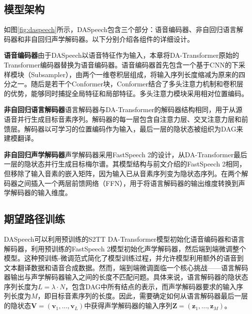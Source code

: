 \subsection{模型架构}\label{sec:daspeech_arch}

如图\ref{fig:daspeech}所示，DASpeech包含三个部分：语音编码器、非自回归语言解码器和非自回归声学解码器。以下分别介绍各组件的详细设计。

\textbf{语音编码器}\quad 由于DASpeech以语音特征作为输入，本章将DA-Transformer原始的Transformer编码器替换为语音编码器。语音编码器首先包含一个基于CNN的下采样模块（Subsampler），由两个一维卷积层组成，将输入序列长度缩减为原来的四分之一。随后是若干个Conformer\citep{conformer}块，Conformer结合了多头注意力机制和卷积层的优势，能够同时捕捉全局特征和局部特征。多头注意力模块采用相对位置编码\citep{dai-etal-2019-transformer}。

\textbf{非自回归语言解码器}\quad 语言解码器与DA-Transformer的解码器结构相同，用于从源语音并行生成目标音素序列。解码器的每一层包含自注意力层、交叉注意力层和前馈层。解码器以可学习的位置编码作为输入，最后一层的隐状态被组织为DAG来建模翻译。

\textbf{非自回归声学解码器}\quad 声学解码器采用FastSpeech 2的设计，从DA-Transformer最后一层的隐状态并行生成目标梅尔谱。其模型结构与前文介绍的FastSpeech 2相同，但移除了输入音素的嵌入矩阵，因为输入已从音素序列变为隐状态序列。在两个解码器之间插入一个两层前馈网络（FFN），用于将语言解码器的输出维度转换到声学解码器的输入维度。




\subsection{期望路径训练}\label{sec:daspeech_train}

DASpeech可以利用预训练的S2TT DA-Transformer模型初始化语音编码器和语言解码器，利用预训练的FastSpeech 2模型初始化声学解码器，然后端到端微调整个模型。这种预训练-微调范式简化了模型训练过程，并允许模型利用额外的语音到文本翻译数据和语音合成数据。然而，端到端微调面临一个核心挑战——语言解码器输出与声学解码器输入之间的长度不匹配问题。具体来说，语言解码器的隐状态序列长度为$L=\lambda \cdot N$，包含DAG中所有结点的表示，而声学解码器要求的输入序列长度为$M$，即目标音素序列的长度。因此，需要确定如何从语言解码器最后一层的隐状态$\mathbf{V}=(\mathbf{v}_1, \ldots, \mathbf{v}_L)$中获得声学解码器的输入序列$\mathbf{Z}=(\mathbf{z}_1, \ldots, \mathbf{z}_M)$。

